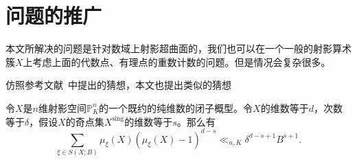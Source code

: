 
\section{问题的推广}
本文所解决的问题是针对数域上射影超曲面的，我们也可以在一个一般的射影算术簇$X$上考虑上面的代数点、有理点的重数计数的问题。但是情况会复杂很多。

仿照参考文献~中提出的猜想，本文也提出类似的猜想

\begin{conjecture}
令$X$是$n$维射影空间$\mathbb P^n_K$的一个既约的纯维数的闭子概型。令$X$的维数等于$d$，次数等于$\delta$，假设$X$的奇点集$X^{\mathrm{sing}}$的维数等于$s$。那么有
\begin{equation}
\sum_{\xi\in S(X;B)} \mu_\xi(X)(\mu_\xi(X)-1)^{d-s} \ll_{n,K} \delta^{d-s+1}B^{s+1}.
\end{equation}
\end{conjecture}
